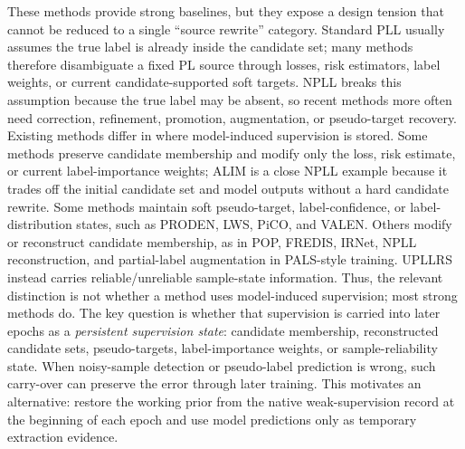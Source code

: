 These methods provide strong baselines, but they expose a design tension that
cannot be reduced to a single ``source rewrite'' category. Standard PLL usually
assumes the true label is already inside the candidate set; many methods
therefore disambiguate a fixed PL source through losses, risk estimators, label
weights, or current candidate-supported soft targets. NPLL breaks this
assumption because the true label may be absent, so recent methods more often
need correction, refinement, promotion, augmentation, or pseudo-target recovery.
Existing methods differ in where model-induced supervision is stored. Some
methods preserve candidate membership and modify only the loss, risk estimate,
or current label-importance weights; ALIM is a close NPLL example because it
trades off the initial candidate set and model outputs without a hard candidate
rewrite. Some methods maintain soft pseudo-target, label-confidence, or
label-distribution states, such as PRODEN, LWS, PiCO, and VALEN. Others modify
or reconstruct candidate membership, as in POP, FREDIS, IRNet, NPLL
reconstruction, and partial-label augmentation in PALS-style training. UPLLRS
instead carries reliable/unreliable sample-state information. Thus, the relevant
distinction is not whether a method uses model-induced supervision; most strong
methods do. The key question is whether that supervision is carried into later
epochs as a \emph{persistent supervision state}: candidate membership,
reconstructed candidate sets, pseudo-targets, label-importance weights, or
sample-reliability state. When noisy-sample detection or pseudo-label prediction
is wrong, such carry-over can preserve the error through later training. This
motivates an alternative: restore the working prior from the native
weak-supervision record at the beginning of each epoch and use model predictions
only as temporary extraction evidence.

